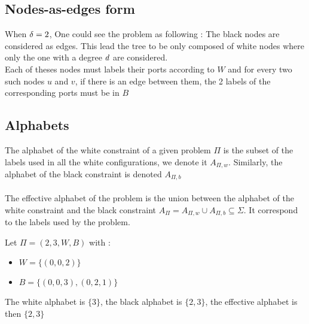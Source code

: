 \subsection{Nodes-as-edges form}
When $\delta = 2$, One could see the problem as following :
The black nodes are considered as edges. This lead the tree to be only composed of white nodes where only the one with a degree $d$ are considered.\\
Each of theses nodes must labels their ports according to $W$ and for every two such nodes $u$ and $v$, if there is an edge between them, the 2 labels of the corresponding ports must be in $B$\\

\subsection{Alphabets}
The alphabet of the white constraint of a given problem $\Pi$ is the subset of the labels used in all the white configurations, we denote it $A_{\Pi,w}$. Similarly, the alphabet of the black constraint is denoted $A_{\Pi,b}$\\\\
The effective alphabet of the problem is the union between the alphabet of the white constraint and the black constraint $A_{\Pi} = A_{\Pi,w} \cup A_{\Pi,b} \subseteq \Sigma$. It correspond to the labels used by the problem.
\begin{exmp}
Let $\Pi = (2,3,W,B)$ with :
\begin{itemize}
    \item $W = \{(0,0,2)\}$
    \item $B = \{(0,0,3),(0,2,1)\}$
\end{itemize}
The white alphabet is $\{3\}$, the black alphabet is $\{2,3\}$, the effective alphabet is then $\{2,3\}$
\end{exmp}
